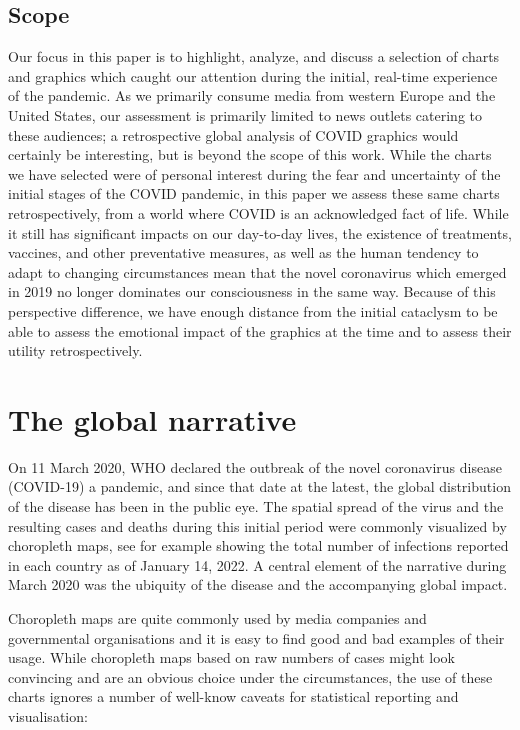 \documentclass[article]{jdssv}\usepackage[]{graphicx}\usepackage[]{xcolor}
\begin{document}
\subsection{Scope}
Our focus in this paper is to highlight, analyze, and discuss a selection of charts and graphics which caught our attention during the initial, real-time experience of the pandemic. As we primarily consume media from western Europe and the United States, our assessment is primarily limited to news outlets catering to these audiences; a retrospective global analysis of COVID graphics would certainly be interesting, but is beyond the scope of this work. While the charts we have selected were of personal interest during the fear and uncertainty of the initial stages of the COVID pandemic, in this paper we assess these same charts retrospectively, from a world where COVID is an acknowledged fact of life. While it still has significant impacts on our day-to-day lives, the existence of treatments, vaccines, and other preventative measures, as well as the human tendency to adapt to changing circumstances mean that the novel coronavirus which emerged in 2019 no longer dominates our consciousness in the same way. Because of this perspective difference, we have enough distance from the initial cataclysm to be able to assess the emotional impact of the graphics at the time and to assess their utility retrospectively.


\section{The global narrative}

On 11 March 2020, WHO declared the outbreak of the novel coronavirus disease (COVID-19) a pandemic, and since that date at the latest, the global distribution of the disease has been in the public eye. The spatial spread of the virus and the resulting cases and deaths during this initial period were commonly visualized by choropleth maps, see for example  showing the total number of infections reported in each country as of January 14, 2022. A central element of the narrative during March 2020 was the ubiquity of the disease and the accompanying global impact. 


Choropleth maps are quite commonly used by media companies and governmental organisations and it is easy to find good and bad examples of their usage. 
While choropleth maps based on raw numbers of cases might look convincing and are an obvious choice under the circumstances, the use of these charts ignores a number of well-know caveats for statistical reporting and visualisation:
\end{document}
